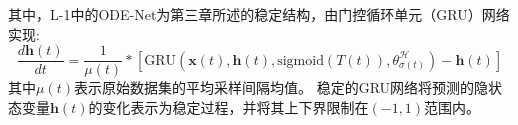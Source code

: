 
其中，L-1中的ODE-Net为第三章所述的稳定结构，由门控循环单元（GRU）网络实现:
\begin{equation}
    \label{equ:dh}
    \frac{d \boldsymbol{h}(t)}{dt} = \frac{1}{\mu(t)}*\left[\text{GRU}(\boldsymbol{x}(t), \boldsymbol{h}(t),\text{sigmoid}(T(t)), \theta^\mathcal{H}_{\sigma(t)}) - \boldsymbol{h}(t)\right]
\end{equation}
其中$\mu(t)$表示原始数据集的平均采样间隔均值。
稳定的GRU网络将预测的隐状态变量$\boldsymbol{h}(t)$的变化表示为稳定过程，并将其上下界限制在$(-1,1)$范围内。





